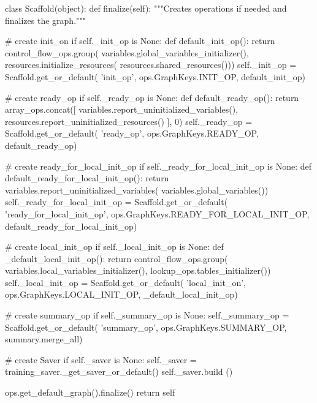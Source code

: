 \begin{content}
\begin{leftbar}
\begin{python}
class Scaffold(object):
  def finalize(self):
    """Creates operations if needed and finalizes the graph."""
    
    # create init\_on
    if self._init_op is None:
      def default_init_op():
        return control_flow_ops.group(
            variables.global_variables_initializer(),
            resources.initialize_resources(
              resources.shared_resources()))
      self._init_op = Scaffold.get_or_default(
          'init_op',
          ops.GraphKeys.INIT_OP,
          default_init_op)

    # create ready\_op
    if self._ready_op is None:
      def default_ready_op():
        return array_ops.concat([
            variables.report_uninitialized_variables(),
            resources.report_uninitialized_resources()
        ], 0)
      self._ready_op = Scaffold.get_or_default(
          'ready_op', 
          ops.GraphKeys.READY_OP,
          default_ready_op)
    
    # create ready\_for\_local\_init\_op
    if self._ready_for_local_init_op is None:
      def default_ready_for_local_init_op():
        return variables.report_uninitialized_variables(
            variables.global_variables())
      self._ready_for_local_init_op = Scaffold.get_or_default(
          'ready_for_local_init_op',
          ops.GraphKeys.READY_FOR_LOCAL_INIT_OP,
          default_ready_for_local_init_op)
    
    # create local\_init\_op
    if self._local_init_op is None:
      def _default_local_init_op():
        return control_flow_ops.group(
            variables.local_variables_initializer(),
            lookup_ops.tables_initializer())
      self._local_init_op = Scaffold.get_or_default(
          'local_init_on',
          ops.GraphKeys.LOCAL_INIT_OP,
          _default_local_init_op)
    
    # create summary\_op
    if self._summary_op is None:
      self._summary_op = Scaffold.get_or_default(
          'summary_op',
          ops.GraphKeys.SUMMARY_OP,
          summary.merge_all)
    
    # create Saver
    if self._saver is None:
      self._saver = training_saver._get_saver_or_default()
    self._saver.build ()

    ops.get_default_graph().finalize()
    return self
\end{python}
\end{leftbar}


\end{content}
